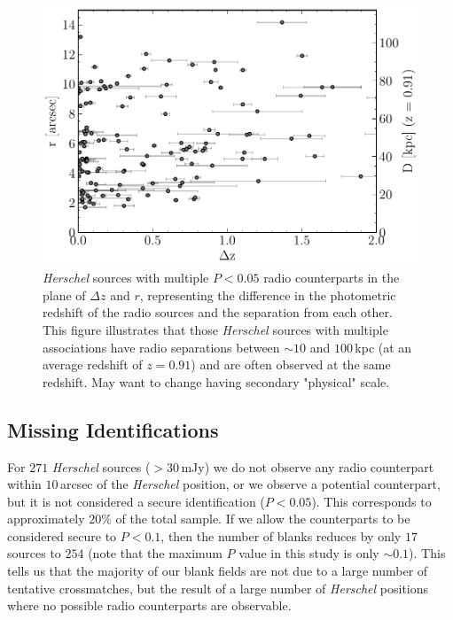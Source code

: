 \begin{figure}
	\centering
	\includegraphics[width=0.8\columnwidth]{Figures/multiples_separation.pdf}
	\caption[Physical separation between radio IDs for a single \textit{Herschel} source]{\textit{Herschel} sources with multiple $P < 0.05$ radio counterparts in the plane of $\Delta z$ and $r$, representing the difference in the photometric redshift of the radio sources and the separation from each other. This figure illustrates that those \textit{Herschel} sources with multiple associations have radio separations between $\sim 10$ and $100\,$kpc (at an average redshift of $z = 0.91$) and are often observed at the same redshift. {\color{red}May want to change having secondary "physical" scale.}}
	\label{fig:multiples_separation}
\end{figure}

\subsection{Missing Identifications}

For $271$ \textit{Herschel} sources ($> 30\,$mJy) we do not observe any radio counterpart within $10\,$arcsec of the \textit{Herschel} position, or we observe a potential counterpart, but it is not considered a secure identification ($P < 0.05$). This corresponds to approximately $20\%$ of the total sample. If we allow the counterparts to be considered secure to $P < 0.1$, then the number of blanks reduces by only $17$ sources to $254$ (note that the maximum $P$ value in this study is only $\sim 0.1$). This tells us that the majority of our blank fields are not due to a large number of tentative crossmatches, but the result of a large number of \textit{Herschel} positions where no possible radio counterparts are observable.

